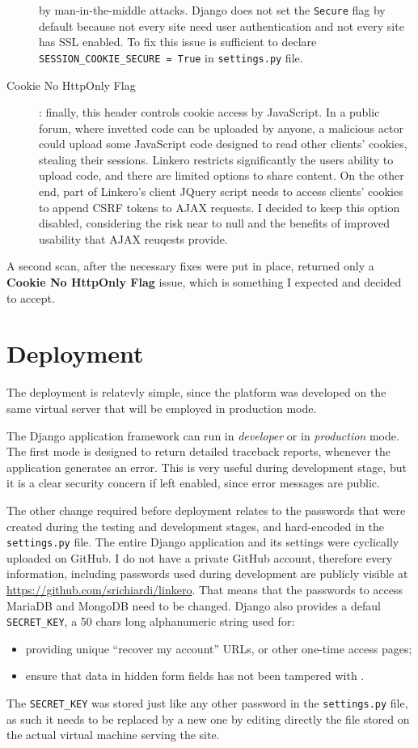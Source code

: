 \begin{description}
  by man-in-the-middle attacks. Django does not set the \texttt{Secure} flag by
  default because not every site need user authentication and not every site has
  SSL enabled. To fix this issue is sufficient to declare
  \texttt{SESSION\_COOKIE\_SECURE = True} in \texttt{settings.py} file.
  \item[Cookie No HttpOnly Flag]: finally, this header controls cookie access by
  JavaScript. In a public forum, where invetted code can be uploaded by anyone,
  a malicious actor could upload some JavaScript code designed to read other
  clients' cookies, stealing their sessions. Linkero restricts significantly the
  users ability to upload code, and there are limited options to share content.
  On the other end, part of Linkero's client JQuery script needs to access
  clients' cookies to append CSRF tokens to AJAX requests. I decided to keep
  this option disabled, considering the risk near to null and the benefits of
  improved usability that AJAX reuqests provide.
\end{description}

A second scan, after the necessary fixes were put in place, returned only a
\textbf{Cookie No HttpOnly Flag} issue, which is something I expected and
decided to accept.


\section{Deployment}
The deployment is relatevly simple, since the platform was developed on the same
virtual server that will be employed in production mode.

The Django application framework can run in \emph{developer} or in
\emph{production} mode. The first mode is designed to return detailed traceback
reports, whenever the application generates an error. This is very useful during
development stage, but it is a clear security concern if left enabled, since
error messages are public.

The other change required before deployment relates to the passwords that were
created during the testing and development stages, and hard-encoded in the
\texttt{settings.py} file. The entire Django application and its settings were
cyclically uploaded on GitHub\texttrademark. I do not have a private
GitHub account, therefore every information, including passwords used during
development are publicly visible at \url{https://github.com/srichiardi/linkero}.
That means that the passwords to access MariaDB and MongoDB need to be changed.
Django also provides a defaul \texttt{SECRET_KEY}, a 50 chars long
alphanumeric string used for:
\begin{itemize}
  \item providing unique ``recover my account'' URLs, or other one-time access
  pages;
  \item ensure that data in hidden form fields has not been tampered with
  \cite{djsecr}.
\end{itemize}
The \texttt{SECRET_KEY} was stored just like any other password in the
\texttt{settings.py} file, as such it needs to be replaced by a new one
by editing directly the file stored on the actual virtual machine serving
the site.
